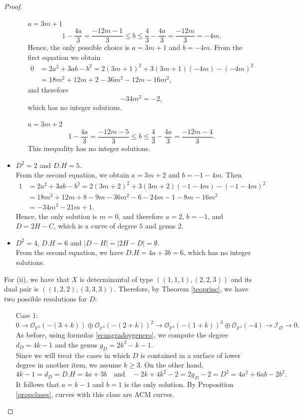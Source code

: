 \documentclass[12pt,reqno]{amsart}
\theoremstyle{plain}
\theoremstyle{definition}
\theoremstyle{remark}
\theoremstyle{definition}
\newcommand{\PP}{\mathds{P}}
\newcommand{\PPP}{\PP^{3}}
\newcommand{\ii}{\mathscr{I}}
\newcommand{\oo}{\mathcal{O}}
\begin{document}
\begin{proof}
\begin{itemize}
\begin{itemize}
        \item[$a=3m+1$] 
        $$1-\frac{4a}{3}=\frac{-12m-1}{3}\leq b \leq \frac{4}{3}-\frac{4a}{3}=\frac{-12m}{3}=-4m.$$
        Hence, the only possible choice is $a=3m+1$ and $b=-4m$. From the first equation we obtain
\begin{align*}
    0&=2a^{2}+3ab-b^{2}=2(3m+1)^{2}+3(3m+1)(-4m)-(-4m)^{2}\\
    &=18m^{2}+12m+2-36m^{2}-12m-16m^{2},
\end{align*}
and therefore
$$-34m^{2}=-2,$$
which has no integer solutions.

        \item[$a=3m+2$] 
        $$1-\frac{4a}{3}=\frac{-12m-5}{3}\leq b \leq \frac{4}{3}-\frac{4a}{3}=\frac{-12m-4}{3}.$$
        This inequality has no integer solutions.
\end{itemize}

        \item $D^{2}=2$ and $D.H=5$.\\
        From the second equation, we obtain $a=3m+2$ and $b=-1-4m$. Then
\begin{align*}
    1&=2a^{2}+3ab-b^{2}=2(3m+2)^{2}+3(3m+2)(-1-4m)-(-1-4m)^{2}\\
    &=18m^{2}+12m+8-9m-36m^{2}-6-24m-1-8m-16m^{2}\\
    &=-34m^{2}-21m+1.
\end{align*}
        Hence, the only solution is $m=0$, and therefore $a=2$, $b=-1$, and $D=2H-C$, which is a curve of degree $5$ and genus $2$.

        \item $D^{2}=4$, $D.H=6$ and $|D-H|=|2H-D|=\emptyset$.\\
        From the second equation, we have $D.H=4a+3b=6$, which has no integer solutions.
\end{itemize}

For (ii), we have that $X$ is determinantal of type $((1,1,1),(2,2,3))$ and its dual pair is $((1,2,2),(3,3,3))$. Therefore, by Theorem \ref{teoprinc}, we have two possible resolutions for $D$:
\begin{itemize}
    \item[Case 1:]  
    $$0\to \oo_{\PPP}(-(3+k))\oplus \oo_{\PPP}(-(2+k))^{2}\to \oo_{\PPP}(-(1+k))^{3}\oplus \oo_{\PPP}(-4)\to \ii_{D}\to 0.$$
    As before, using formulas \eqref{ecuagradoygenero}, we compute the degree $d_{D}=4k-1$ and the genus $g_{D}=2k^{2}-k-1$.\\
    Since we will treat the cases in which $D$ is contained in a surface of lower degree in another item, we assume $k\geq 3$. On the other hand,
$$4k-1=d_{D}=D.H=4a+3b \quad \text{and} \quad -2k+4k^{2}-2=2g_{D}-2=D^{2}=4a^{2}+6ab-2b^{2}.$$
    It follows that $a=k-1$ and $b=1$ is the only solution. By Proposition \ref{propclases}, curves with this class are ACM curves.


\end{itemize}
\end{proof}
\end{document}
